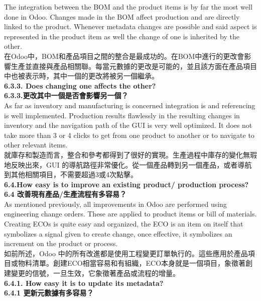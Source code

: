 \documentclass[12pt,a4paper]{report}  %
\begin{document}
The integration between the BOM and the product items is by far the most well done in 
Odoo. Changes made in the BOM affect production and are directly linked to the product. 
Whenever metadata changes are possible and said aspect is represented in the product item 
as well the change of one is inherited by the other.\\
在Odoo中，BOM和產品項目之間的整合是最成功的。在BOM中進行的更改會影響生產並直接與產品相關聯。每當元數據的更改是可能的，並且該方面在產品項目中也被表示時，其中一個的更改將被另一個繼承。\\

\Large\textbf{6.3.3. Does changing one affects the other?}\\
\Large\textbf{6.3.3.更改其中一個是否會影響另一個？}\\

As far as inventory and manufacturing is concerned integration is and referencing is well 
implemented. Production results flawlessly in the resulting changes in inventory and the 
navigation path of the GUI is very well optimized. It does not take more than 3 or 4 clicks 
to get from one product to another or to navigate to other relevant items.\\
就庫存和製造而言，整合和參考都得到了很好的實現。生產過程中庫存的變化無瑕地反映出來，GUI 的導航路徑非常優化。從一個產品轉到另一個產品，或者導航到其他相關項目，不需要超過3或4次點擊。\\

\Large\textbf{6.4.How easy is to improve an existing product/ production process?}\\
\Large\textbf{6.4 改善現有產品/生產流程有多容易？}\\

 As mentioned previously, all improvements in Odoo are performed using engineering 
change orders. These are applied to product items or bill of materials. Creating ECOs is quite 
easy and organized, the ECO is an item on itself that symbolizes a signal given to create 
change, once effective, it symbolizes an increment on the product or process.\\
如前所述，Odoo 中的所有改進都是使用工程變更訂單執行的。這些應用於產品項目或物料清單。創建ECO相當容易和有組織，ECO本身就是一個項目，象徵著創建變更的信號，一旦生效，它象徵著產品或流程的增量。\\

\Large\textbf{6.4.1. How easy it is to update its metadata?}\\
\Large\textbf{6.4.1 更新元數據有多容易？}\\
\end{document}
